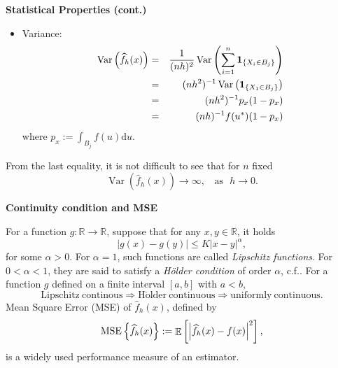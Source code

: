 \documentclass[19pt,landscaoe]{article}
\newcommand{\bone}{{\bf 1}}
\DeclareMathOperator{\E}{\mathbb{E}}
\newcommand{\R}{\mathbb{R}}
\DeclareMathOperator{\var}{\mathrm{Var}}
\begin{document}
\newpage
{\LARGE\centerline{\textbf{Statistical Properties (cont.)}}}
\vskip25pt
\begin{minipage}{.9\textwidth}
    \Large
    \begin{itemize}
        \item Variance:
        \begin{eqnarray}
            \var\left(\widehat{f}_h(x)\right)&=&\frac1{(nh)^2}\var\left(\sum_{i=1}^n\bone_{\{X_i\in B_j\}}\right)\nonumber\\
            &=&(nh^2)^{-1}\var\left(\bone_{\{X_1\in B_j\}}\right)\nonumber\\
            &=&(nh^2)^{-1}p_x(1-p_x)\\
            &=&(nh)^{-1}f(u^*)(1-p_x)\label{var-bound1}
        \end{eqnarray}
        where $p_x:=\int_{B_j}f(u)\mathrm{d}u$.
    \end{itemize}
From the last equality, it is not difficult to see that for $n$ fixed 
$$\var\left(\widehat{f}_h(x)\right)\to\infty,~~~~\mathrm{as}~~~h\to0.$$ 
\end{minipage}


\newpage
{\LARGE\centerline{\textbf{Continuity condition and MSE}}}
\vskip25pt
\begin{minipage}{.9\textwidth}
    \Large
        For a function $g:\R\to\R$, suppose that for any $x,y\in\R$, it holds 
        \begin{equation}
            |g(x)-g(y)|\le K|x-y|^\alpha,
        \end{equation}
        for some $\alpha>0$. 
        For $\alpha=1$, such functions are called {\it Lipschitz functions}. For $0<\alpha<1$, they are said to satisfy a {\it H\"older condition} of order $\alpha$, c.f.\cite[Page~56]{Dudley02}. 
\vskip 5pt
        For a function $g$ defined on a finite interval $[a,b]$ with $a<b$, 
        $$\mathrm{Lipschitz~continous}\Rightarrow \mathrm{H\ddot{o}lder~continuous}\Rightarrow \mathrm{uniformly~continuous}.$$
Mean Square Error (MSE) of $\widehat{f}_h(x)$, defined by 
\begin{eqnarray}
    {\rm MSE}\left\{\widehat{f}_h(x)\right\}:=\E\left[\left|\widehat{f}_h(x)-f(x)\right|^2\right],
\end{eqnarray}
is a widely used performance measure of an estimator. 
\end{minipage}
\end{document}
